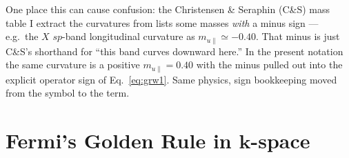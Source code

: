 \documentclass[11pt,a4paper]{article}
\numberwithin{equation}{section}
\begin{document}
One place this can cause confusion: the Christensen \& Seraphin (C\&S)
mass table I extract the curvatures from lists some masses \emph{with}
a minus sign --- e.g.\ the $X$ $sp$-band longitudinal curvature as
$m_{u\parallel}\simeq-0.40$. That minus is just C\&S's shorthand for
``this band curves downward here.'' In the present notation the same
curvature is a positive $m_{u\parallel}=0.40$ with the minus pulled
out into the explicit operator sign of Eq.~\eqref{eq:grw1}. Same
physics, sign bookkeeping moved from the symbol to the term.

\section{Fermi's Golden Rule in $\mathbf k$-space}\label{sec:fgr}
\end{document}
